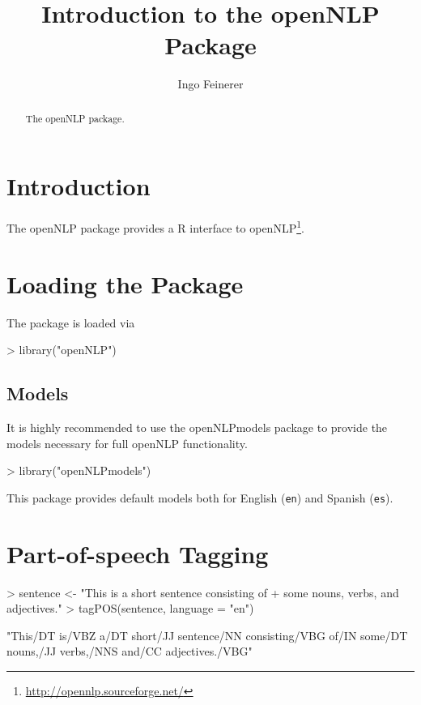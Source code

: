 \documentclass[a4paper]{article}
\newcommand{\strong}[1]{{\normalfont\fontseries{b}\selectfont #1}}
\newcommand{\code}[1]{\mbox{\texttt{#1}}}
\newcommand{\pkg}[1]{\strong{#1}}
\newcommand{\proglang}[1]{\textsf{#1}}
\begin{document}
\title{Introduction to the \pkg{openNLP} Package}
\author{Ingo Feinerer}
\maketitle
\sloppy

\begin{abstract}
  The \pkg{openNLP} package.
\end{abstract}

\section*{Introduction}
The \pkg{openNLP} package provides a \proglang{R} interface to
\proglang{openNLP}\footnote{\url{http://opennlp.sourceforge.net/}}.

\section*{Loading the Package}
The package is loaded via
\begin{Schunk}
\begin{Sinput}
> library("openNLP")
\end{Sinput}
\end{Schunk}

\subsection*{Models}
It is highly recommended to use the \pkg{openNLPmodels} package to
provide the models necessary for full \pkg{openNLP} functionality.
\begin{Schunk}
\begin{Sinput}
> library("openNLPmodels")
\end{Sinput}
\end{Schunk}
This package provides default models both for English (\code{en}) and
Spanish (\code{es}).

\section*{Part-of-speech Tagging}
\begin{Schunk}
\begin{Sinput}
> sentence <- "This is a short sentence consisting of
+              some nouns, verbs, and adjectives."
> tagPOS(sentence, language = "en")
\end{Sinput}
\begin{Soutput}
[1] "This/DT is/VBZ a/DT short/JJ sentence/NN consisting/VBG of/IN some/DT nouns,/JJ verbs,/NNS and/CC adjectives./VBG"
\end{Soutput}
\end{Schunk}
\end{document}
